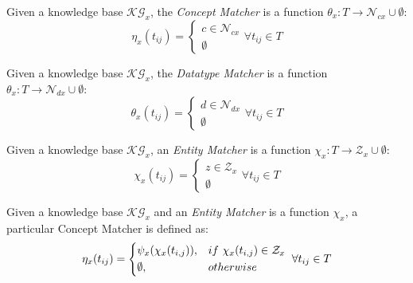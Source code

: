 \documentclass{llncs}
\begin{document}
\begin{definition}
      Given a knowledge base $\mathcal{KG}_x$, the \textit{Concept Matcher} is a function $\theta_x: T \to \mathcal{N}_{cx} \cup \emptyset$:
      \begin{equation}
            \eta_x(t_{ij})=
            \begin{cases}
                  c\in\mathcal{N}_{cx}
                  \\
                  \emptyset
            \end{cases}
            \forall t_{ij} \in T
      \end{equation}
\end{definition}
\begin{definition}
      Given a knowledge base $\mathcal{KG}_x$, the \textit{Datatype Matcher} is a function $\theta_x: T \to \mathcal{N}_{dx} \cup \emptyset$:
      \begin{equation}
            \theta_x(t_{ij})=
            \begin{cases}
                  d\in\mathcal{N}_{dx}
                  \\
                  \emptyset
            \end{cases}
            \forall t_{ij} \in T
      \end{equation}
\end{definition}

\begin{definition} Given a knowledge base $\mathcal{KG}_x$, an \textit{Entity Matcher} is a function $\chi_x: T \to \mathcal{Z}_x \cup \emptyset$:
      \begin{equation}
            \chi_x(t_{ij})=
            \begin{cases}
                  z\in\mathcal{Z}_x
                  \\
                  \emptyset
            \end{cases}
            \forall t_{ij} \in T
      \end{equation}
\end{definition}

\begin{lemma} Given a knowledge base $\mathcal{KG}_x$ and an \textit{Entity Matcher} is a function $\chi_x$, a particular Concept Matcher is defined as:
      \begin{equation}
            \eta_x(t_{ij})=
            \begin{dcases}
                  \psi_x(\chi_x(t_{i,j})), & if~ \chi_x(t_{i,j})\in \mathcal{Z}_x
                  \\
                  \emptyset,               & otherwise
            \end{dcases}
            ~\forall t_{ij} \in T
      \end{equation}
\end{lemma}
\end{document}
